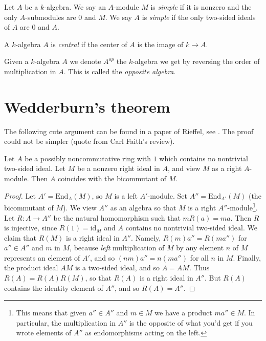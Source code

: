 \begin{definition}
\label{definition-simple}
Let $A$ be a $k$-algebra.
We say an $A$-module $M$ is {\it simple} if it is nonzero and
the only $A$-submodules are $0$ and $M$.
We say $A$ is {\it simple} if the only two-sided ideals of $A$ are
$0$ and $A$.
\end{definition}

\begin{definition}
\label{definition-central}
A $k$-algebra $A$ is {\it central} if the center of $A$ is the image of
$k \to A$.
\end{definition}

\begin{definition}
\label{definition-opposite}
Given a $k$-algebra $A$ we denote $A^{op}$ the $k$-algebra we get by
reversing the order of multiplication in $A$. This is called the
{\it opposite algebra}.
\end{definition}




\section{Wedderburn's theorem}
\label{section-wedderburn}

\noindent
The following cute argument can be found in a paper of Rieffel, see
\cite{Rieffel}. The proof could not be simpler (quote from
Carl Faith's review).

\begin{lemma}
\label{lemma-rieffel}
Let $A$ be a possibly noncommutative ring with $1$ which contains no
nontrivial two-sided ideal. Let $M$ be a nonzero right ideal in $A$,
and view $M$ as a right $A$-module. Then $A$ coincides with the
bicommutant of $M$.
\end{lemma}

\begin{proof}
Let $A' = \text{End}_A(M)$, so $M$ is a left $A'$-module.
Set $A'' = \text{End}_{A'}(M)$ (the bicommutant of $M$).
We view $A''$ as an algebra so that $M$ is a right $A''$-module\footnote{This
means that given $a'' \in A''$ and $m \in M$ we have a product
$m a'' \in M$. In particular, the multiplication in $A''$
is the opposite of what you'd get if you wrote elements of $A''$
as endomorphisms acting on the left.}.
Let $R : A \to A''$ be the natural homomorphism such that
$mR(a) = ma$. Then $R$ is injective, since $R(1) = \text{id}_M$
and $A$ contains no nontrivial two-sided ideal. We claim that $R(M)$
is a right ideal in $A''$. Namely, $R(m)a'' = R(ma'')$ for $a'' \in A''$
and $m$ in $M$, because {\it left} multiplication of $M$ by any element $n$
of $M$ represents an element of $A'$, and so
$(nm)a'' = n(ma'')$ for all $n$ in $M$.
Finally, the product ideal $AM$ is a two-sided ideal, and so
$A = AM$. Thus $R(A) = R(A)R(M)$, so that $R(A)$ is a right ideal in $A''$.
But $R(A)$ contains the identity element of $A''$, and so $R(A) = A''$.
\end{proof}

